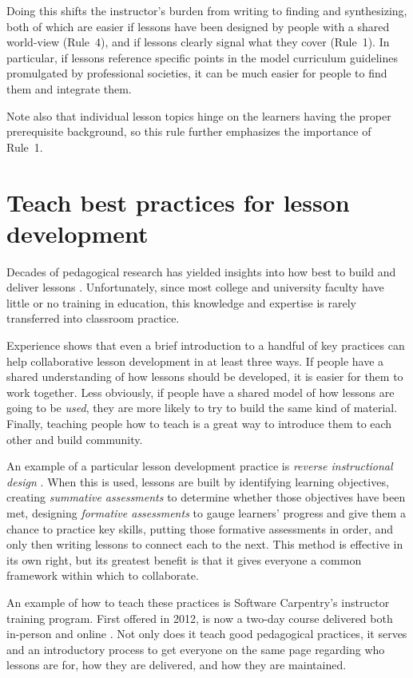 \documentclass[10pt,letterpaper]{article}
\newcommand{\rulemajor}[1]{\section{#1}}
\begin{document}
Doing this shifts the instructor's burden from writing to finding and synthesizing,
both of which are easier if lessons have been designed by people with a shared world-view (Rule~4),
and if lessons clearly signal what they cover (Rule~1).
In particular,
if lessons reference specific points in the model curriculum guidelines promulgated by professional societies,
it can be much easier for people to find them and integrate them.

Note also that individual lesson topics hinge on the learners having the proper prerequisite background,
so this rule further emphasizes the importance of Rule~1.

\rulemajor{Teach best practices for lesson development}

Decades of pedagogical research has yielded insights into
how best to build and deliver lessons \cite{hlw}.
Unfortunately,
since most college and university faculty have little or no training in education,
this knowledge and expertise is rarely transferred into classroom practice.

Experience shows that even a brief introduction to a handful of key practices
can help collaborative lesson development in at least three ways.
If people have a shared understanding of how lessons should be developed,
it is easier for them to work together.
Less obviously,
if people have a shared model of how lessons are going to be \emph{used},
they are more likely to try to build the same kind of material.
Finally,
teaching people how to teach is a great way to introduce them to each other and build community.

An example of a particular lesson development practice is \emph{reverse instructional design}
\cite{wiggins-mctighe}.
When this is used,
lessons are built by
identifying learning objectives,
creating \emph{summative assessments} to determine whether those objectives have been met,
designing \emph{formative assessments} to gauge learners' progress
and give them a chance to practice key skills,
putting those formative assessments in order,
and only then writing lessons to connect each to the next.
This method is effective in its own right,
but its greatest benefit is that it gives everyone a common framework
within which to collaborate.

An example of how to teach these practices is Software Carpentry's instructor training program.
First offered in 2012,
is now a two-day course delivered both in-person and online
\cite{lessons-learned,instructor-training,how-to-teach-programming}.
Not only does it teach good pedagogical practices,
it serves and an introductory process to get everyone on the same page
regarding who lessons are for,
how they are delivered,
and how they are maintained.
\end{document}
